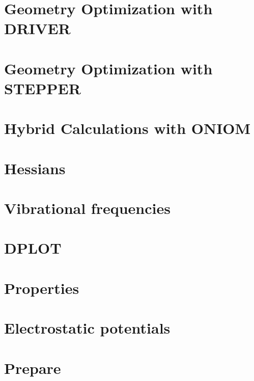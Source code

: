 %


\chapter{Geometry Optimization with DRIVER}


\chapter{Geometry Optimization with STEPPER}


\chapter{Hybrid Calculations with ONIOM}


\chapter{Hessians}


\chapter{Vibrational frequencies}


\chapter{DPLOT}


\chapter{Properties}


\chapter{Electrostatic potentials}


\chapter{Prepare}


